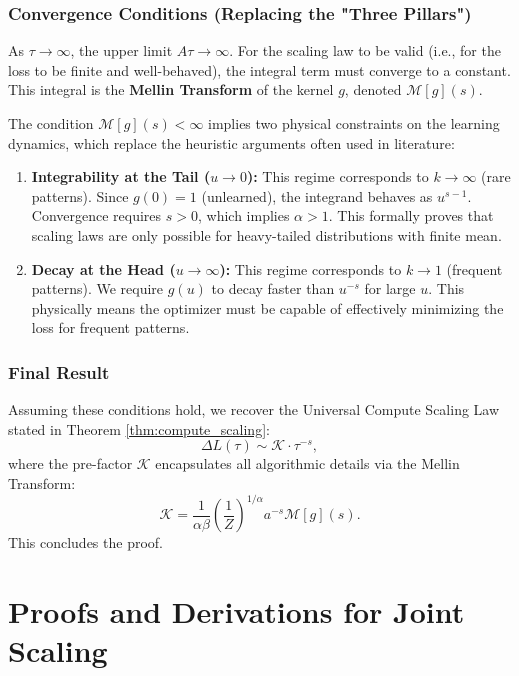 \documentclass{article}
\theoremstyle{plain}
\theoremstyle{definition}
\theoremstyle{remark}
\begin{document}
\subsubsection{Convergence Conditions (Replacing the "Three Pillars")}

As $\tau \to \infty$, the upper limit $A\tau \to \infty$. For the scaling law to be valid (i.e., for the loss to be finite and well-behaved), the integral term must converge to a constant. This integral is the \textbf{Mellin Transform} of the kernel $g$, denoted $\mathcal{M}[g](s)$.

The condition $\mathcal{M}[g](s) < \infty$ implies two physical constraints on the learning dynamics, which replace the heuristic arguments often used in literature:

\begin{enumerate}
    \item \textbf{Integrability at the Tail ($u \to 0$):} This regime corresponds to $k \to \infty$ (rare patterns). Since $g(0)=1$ (unlearned), the integrand behaves as $u^{s-1}$. Convergence requires $s > 0$, which implies $\alpha > 1$. This formally proves that scaling laws are only possible for heavy-tailed distributions with finite mean.
    \item \textbf{Decay at the Head ($u \to \infty$):} This regime corresponds to $k \to 1$ (frequent patterns). We require $g(u)$ to decay faster than $u^{-s}$ for large $u$. This physically means the optimizer must be capable of effectively minimizing the loss for frequent patterns.
\end{enumerate}

\subsubsection{Final Result}

Assuming these conditions hold, we recover the Universal Compute Scaling Law stated in Theorem \ref{thm:compute_scaling}:
\begin{equation*}
    \Delta L(\tau) \sim \mathcal{K} \cdot \tau^{-s},
\end{equation*}
where the pre-factor $\mathcal{K}$ encapsulates all algorithmic details via the Mellin Transform:
\begin{equation*}
    \mathcal{K} = \frac{1}{\alpha\beta} \left(\frac{1}{Z}\right)^{1/\alpha} a^{-s} \mathcal{M}[g](s).
\end{equation*}
This concludes the proof.


\section{Proofs and Derivations for Joint Scaling}
\label{app:bottleneck_proofs}
\end{document}
